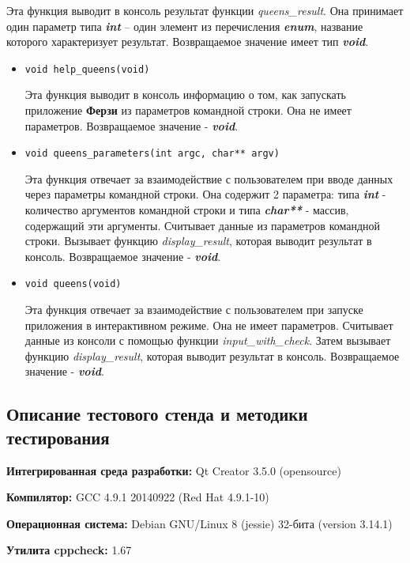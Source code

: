 \documentclass[12pt,a4paper]{report}
\begin{document}
\begin{enumerate}
\begin{itemize}
Эта функция выводит в консоль результат функции \textit{queens\_result}. Она принимает один параметр типа \textit{\textbf{int}} -- один элемент из перечисления \textit{\textbf{enum}}, название которого характеризует результат. Возвращаемое значение имеет тип \textit{\textbf{void}}.
\end{itemize}

\begin{itemize}
\item \verb-void help_queens(void)-

Эта функция выводит в консоль информацию о том, как запускать приложение \textbf{Ферзи} из параметров командной строки. Она не имеет параметров. Возвращаемое значение - \textit{\textbf{void}}.
\end{itemize}

\begin{itemize}
\item \verb-void queens_parameters(int argc, char** argv)-

Эта функция отвечает за взаимодействие с пользователем при вводе данных через параметры командной строки. Она содержит 2 параметра: типа \textbf{\textit{int}} - количество аргументов командной строки и типа \textbf{\textit{char**}} - массив, содержащий эти аргументы. Считывает данные из параметров командной строки. Вызывает функцию \textit{display\_result}, которая выводит результат в консоль. Возвращаемое значение - \textit{\textbf{void}}.
\end{itemize}

\begin{itemize}
\item \verb-void queens(void)-

Эта функция отвечает за взаимодействие с пользователем при запуске приложения в интерактивном режиме. Она не имеет параметров. Считывает данные из консоли с помощью функции \textit{input\_with\_check}. Затем вызывает функцию %
\textit{display\_result}, которая выводит результат в консоль. Возвращаемое значение - \textit{\textbf{void}}.
\end{itemize}
\end{enumerate}
\subsection{Описание тестового стенда и методики тестирования}

\begin{flushleft}
\textbf{Интегрированная среда разработки:} Qt Creator 3.5.0 (opensource)

\textbf{Компилятор:} GCC 4.9.1 20140922 (Red Hat 4.9.1-10)

\textbf{Операционная система:} Debian GNU/Linux 8 (jessie) 32-бита (version 3.14.1)

\textbf{Утилита cppcheck:} 1.67
\end{flushleft}
\end{document}
